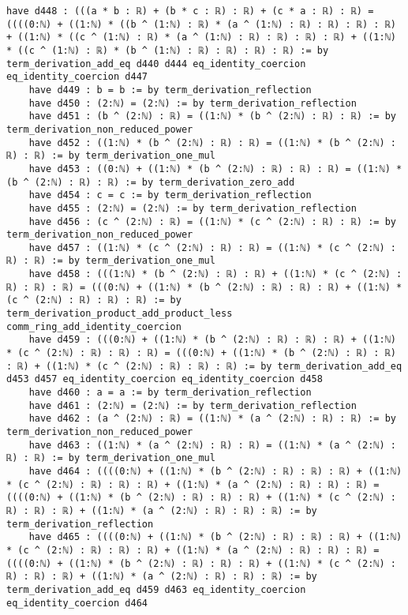 \documentclass{article}
\begin{document}
\begin{tcolorbox}[colback=white!10, width=\linewidth]
\begin{lstlisting}[language=Lean4]
    have d448 : (((a * b : ℝ) + (b * c : ℝ) : ℝ) + (c * a : ℝ) : ℝ) = ((((0:ℕ) + ((1:ℕ) * ((b ^ (1:ℕ) : ℝ) * (a ^ (1:ℕ) : ℝ) : ℝ) : ℝ) : ℝ) + ((1:ℕ) * ((c ^ (1:ℕ) : ℝ) * (a ^ (1:ℕ) : ℝ) : ℝ) : ℝ) : ℝ) + ((1:ℕ) * ((c ^ (1:ℕ) : ℝ) * (b ^ (1:ℕ) : ℝ) : ℝ) : ℝ) : ℝ) := by term_derivation_add_eq d440 d444 eq_identity_coercion eq_identity_coercion d447
    have d449 : b = b := by term_derivation_reflection
    have d450 : (2:ℕ) = (2:ℕ) := by term_derivation_reflection
    have d451 : (b ^ (2:ℕ) : ℝ) = ((1:ℕ) * (b ^ (2:ℕ) : ℝ) : ℝ) := by term_derivation_non_reduced_power
    have d452 : ((1:ℕ) * (b ^ (2:ℕ) : ℝ) : ℝ) = ((1:ℕ) * (b ^ (2:ℕ) : ℝ) : ℝ) := by term_derivation_one_mul
    have d453 : ((0:ℕ) + ((1:ℕ) * (b ^ (2:ℕ) : ℝ) : ℝ) : ℝ) = ((1:ℕ) * (b ^ (2:ℕ) : ℝ) : ℝ) := by term_derivation_zero_add
    have d454 : c = c := by term_derivation_reflection
    have d455 : (2:ℕ) = (2:ℕ) := by term_derivation_reflection
    have d456 : (c ^ (2:ℕ) : ℝ) = ((1:ℕ) * (c ^ (2:ℕ) : ℝ) : ℝ) := by term_derivation_non_reduced_power
    have d457 : ((1:ℕ) * (c ^ (2:ℕ) : ℝ) : ℝ) = ((1:ℕ) * (c ^ (2:ℕ) : ℝ) : ℝ) := by term_derivation_one_mul
    have d458 : (((1:ℕ) * (b ^ (2:ℕ) : ℝ) : ℝ) + ((1:ℕ) * (c ^ (2:ℕ) : ℝ) : ℝ) : ℝ) = (((0:ℕ) + ((1:ℕ) * (b ^ (2:ℕ) : ℝ) : ℝ) : ℝ) + ((1:ℕ) * (c ^ (2:ℕ) : ℝ) : ℝ) : ℝ) := by term_derivation_product_add_product_less comm_ring_add_identity_coercion
    have d459 : (((0:ℕ) + ((1:ℕ) * (b ^ (2:ℕ) : ℝ) : ℝ) : ℝ) + ((1:ℕ) * (c ^ (2:ℕ) : ℝ) : ℝ) : ℝ) = (((0:ℕ) + ((1:ℕ) * (b ^ (2:ℕ) : ℝ) : ℝ) : ℝ) + ((1:ℕ) * (c ^ (2:ℕ) : ℝ) : ℝ) : ℝ) := by term_derivation_add_eq d453 d457 eq_identity_coercion eq_identity_coercion d458
    have d460 : a = a := by term_derivation_reflection
    have d461 : (2:ℕ) = (2:ℕ) := by term_derivation_reflection
    have d462 : (a ^ (2:ℕ) : ℝ) = ((1:ℕ) * (a ^ (2:ℕ) : ℝ) : ℝ) := by term_derivation_non_reduced_power
    have d463 : ((1:ℕ) * (a ^ (2:ℕ) : ℝ) : ℝ) = ((1:ℕ) * (a ^ (2:ℕ) : ℝ) : ℝ) := by term_derivation_one_mul
    have d464 : ((((0:ℕ) + ((1:ℕ) * (b ^ (2:ℕ) : ℝ) : ℝ) : ℝ) + ((1:ℕ) * (c ^ (2:ℕ) : ℝ) : ℝ) : ℝ) + ((1:ℕ) * (a ^ (2:ℕ) : ℝ) : ℝ) : ℝ) = ((((0:ℕ) + ((1:ℕ) * (b ^ (2:ℕ) : ℝ) : ℝ) : ℝ) + ((1:ℕ) * (c ^ (2:ℕ) : ℝ) : ℝ) : ℝ) + ((1:ℕ) * (a ^ (2:ℕ) : ℝ) : ℝ) : ℝ) := by term_derivation_reflection
    have d465 : ((((0:ℕ) + ((1:ℕ) * (b ^ (2:ℕ) : ℝ) : ℝ) : ℝ) + ((1:ℕ) * (c ^ (2:ℕ) : ℝ) : ℝ) : ℝ) + ((1:ℕ) * (a ^ (2:ℕ) : ℝ) : ℝ) : ℝ) = ((((0:ℕ) + ((1:ℕ) * (b ^ (2:ℕ) : ℝ) : ℝ) : ℝ) + ((1:ℕ) * (c ^ (2:ℕ) : ℝ) : ℝ) : ℝ) + ((1:ℕ) * (a ^ (2:ℕ) : ℝ) : ℝ) : ℝ) := by term_derivation_add_eq d459 d463 eq_identity_coercion eq_identity_coercion d464

\end{lstlisting}
\end{tcolorbox}
\end{document}
